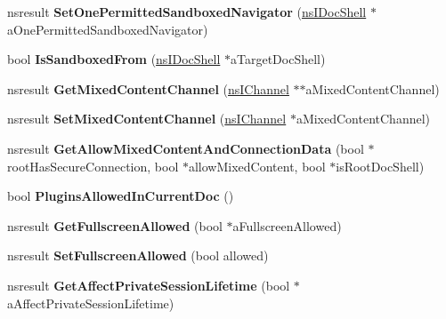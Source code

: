 \begin{DoxyCompactItemize}
nsresult {\bfseries Set\+One\+Permitted\+Sandboxed\+Navigator} (\hyperlink{interfacens_i_doc_shell}{ns\+I\+Doc\+Shell} $\ast$a\+One\+Permitted\+Sandboxed\+Navigator)
\item 
\mbox{\label{interfacens_i_doc_shell_a578cbe641167037e384e450767cd4b4a}} 
bool {\bfseries Is\+Sandboxed\+From} (\hyperlink{interfacens_i_doc_shell}{ns\+I\+Doc\+Shell} $\ast$a\+Target\+Doc\+Shell)
\item 
\mbox{\label{interfacens_i_doc_shell_a733f8ad0e1ac6ac67b2ef611b6e29633}} 
nsresult {\bfseries Get\+Mixed\+Content\+Channel} (\hyperlink{interfacens_i_channel}{ns\+I\+Channel} $\ast$$\ast$a\+Mixed\+Content\+Channel)
\item 
\mbox{\label{interfacens_i_doc_shell_a26e300cce696363eff6a3e80885bf9bb}} 
nsresult {\bfseries Set\+Mixed\+Content\+Channel} (\hyperlink{interfacens_i_channel}{ns\+I\+Channel} $\ast$a\+Mixed\+Content\+Channel)
\item 
\mbox{\label{interfacens_i_doc_shell_a1785adf2f0a67787333395a659302116}} 
nsresult {\bfseries Get\+Allow\+Mixed\+Content\+And\+Connection\+Data} (bool $\ast$root\+Has\+Secure\+Connection, bool $\ast$allow\+Mixed\+Content, bool $\ast$is\+Root\+Doc\+Shell)
\item 
\mbox{\label{interfacens_i_doc_shell_a04748e85a338a3f3a45359dfeb189718}} 
bool {\bfseries Plugins\+Allowed\+In\+Current\+Doc} ()
\item 
\mbox{\label{interfacens_i_doc_shell_a7414368ef96b97a6a3a7769afe308c57}} 
nsresult {\bfseries Get\+Fullscreen\+Allowed} (bool $\ast$a\+Fullscreen\+Allowed)
\item 
\mbox{\label{interfacens_i_doc_shell_a86ad956b1769d21f16002987982c180e}} 
nsresult {\bfseries Set\+Fullscreen\+Allowed} (bool allowed)
\item 
\mbox{\label{interfacens_i_doc_shell_a7f336f67e8f5d0fcfff4698eb3b39696}} 
nsresult {\bfseries Get\+Affect\+Private\+Session\+Lifetime} (bool $\ast$a\+Affect\+Private\+Session\+Lifetime)
\item 
$$
\end{DoxyCompactItemize}
